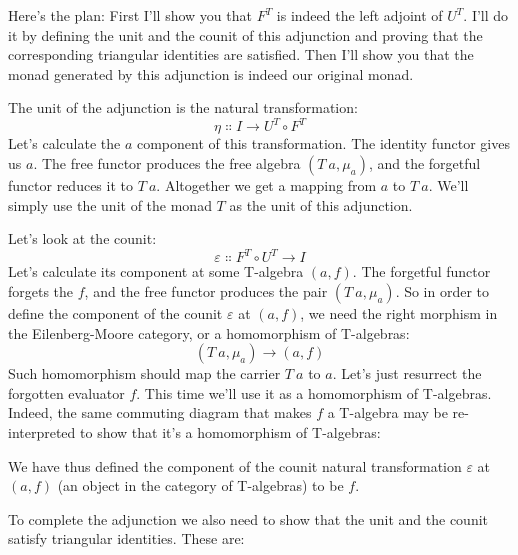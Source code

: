 Here's the plan: First I'll show you that $F^T$ is indeed the left
adjoint of $U^T$. I'll do it by defining the unit and the counit
of this adjunction and proving that the corresponding triangular
identities are satisfied. Then I'll show you that the monad generated by
this adjunction is indeed our original monad.

The unit of the adjunction is the natural transformation:
\[\eta \Colon I \to U^T \circ F^T\]
Let's calculate the $a$ component of this transformation. The
identity functor gives us $a$. The free functor produces the free
algebra $(T\ a, \mu_a)$, and the forgetful functor reduces it to
$T\ a$. Altogether we get a mapping from $a$ to
$T\ a$. We'll simply use the unit of the monad $T$ as the
unit of this adjunction.

Let's look at the counit:
\[\varepsilon \Colon F^T \circ U^T \to I\]
Let's calculate its component at some T-algebra $(a, f)$. The
forgetful functor forgets the $f$, and the free functor produces
the pair $(T\ a, \mu_a)$. So in order to define the component of
the counit $\varepsilon$ at $(a, f)$, we need the right morphism in
the Eilenberg-Moore category, or a homomorphism of T-algebras:
\[(T\ a, \mu_a) \to (a, f)\]
Such homomorphism should map the carrier $T\ a$ to $a$.
Let's just resurrect the forgotten evaluator $f$. This time we'll
use it as a homomorphism of T-algebras. Indeed, the same commuting
diagram that makes $f$ a T-algebra may be re-interpreted to show
that it's a homomorphism of T-algebras:

\begin{figure}[H]
\centering
{}
\end{figure}

\noindent
We have thus defined the component of the counit natural transformation
$\varepsilon$ at $(a, f)$ (an object in the category of T-algebras)
to be $f$.

To complete the adjunction we also need to show that the unit and the
counit satisfy triangular identities. These are:

